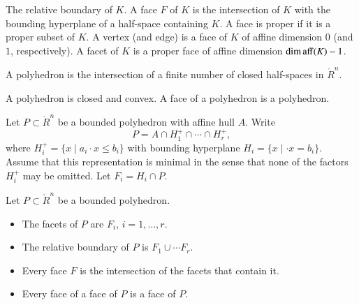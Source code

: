 \begin{definition}
The relative boundary of $K$.  A face $F$ of $K$ is the intersection of $K$ with the bounding hyperplane of a half-space containing $K$.  A face is proper if it is a proper subset of $K$.    A vertex (and edge) is a face of $K$ of affine dimension $0$ (and $1$, respectively).   A facet of $K$ is a proper face of affine dimension $\operatorname{dim\,aff}(K)-1$.
\end{definition}

%

\begin{definition}[polyhedron]  A polyhedron is the intersection of
a finite number of closed half-spaces in $\ring{R}^n$.
\end{definition}

A polyhedron is closed and convex.  A face of a polyhedron is a polyhedron. %

Let $P\subset\ring{R}^n$ be a bounded polyhedron with affine hull $A$. Write 
$$
P = A \cap H^+_1 \cap \cdots \cap H^+_r,
$$
where
$H^+_i = \{x\mid a_i\cdot x \le b_i\}$ with bounding hyperplane
$H_i=\{x\mid \cdot x = b_i\}$. Assume that this representation is minimal in the sense that none of the factors $H^+_i$ may be omitted.  Let $F_i = H_i\cap P$.


\begin{lemma}\label{lemma:webster}  
Let $P\subset\ring{R}^n$ be a bounded polyhedron.
\begin{itemize}
\item The facets of $P$ are $F_i$, $i=1,\ldots,r$.
\item The relative boundary of $P$ is $F_1\cup\cdots F_r$.
\item Every face $F$ is the intersection of the facets that contain it.
\item Every face of a face of $P$ is a face of $P$.
\end{itemize}
\end{lemma}

